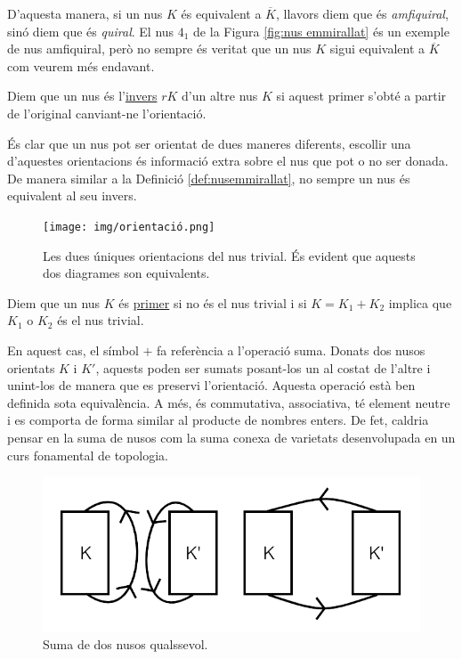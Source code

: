 D'aquesta manera, si un nus $K$ és equivalent a $\overline{K}$, llavors diem que és \textit{amfiquiral}, sinó diem que és \textit{quiral}. El nus $4_1$ de la Figura \ref{fig:nus emmirallat} és un exemple de nus amfiquiral, però no sempre és veritat que un nus $K$ sigui equivalent a $\overline{K}$ com veurem més endavant.

\begin{definition}\label{def:nusinvers}
	Diem que un nus és l'\underline{invers} $rK$ d'un altre nus $K$ si aquest primer s'obté a partir de l'original canviant-ne l'orientació.
\end{definition}

És clar que un nus pot ser orientat de dues maneres diferents, escollir una d'aquestes orientacions és informació extra sobre el nus que pot o no ser donada. De manera similar a la Definició \ref{def:nusemmirallat}, no sempre un nus és equivalent al  seu invers.

\begin{figure}
	\centering
	\texttt{[image: img/orientació.png]}
	\caption{Les dues úniques orientacions del nus trivial. És evident que aquests dos diagrames son equivalents.}\label{fig:nusorientat}
\end{figure}

\begin{definition}
	Diem que un nus $K$ és \underline{primer} si no és el nus trivial i si $K=K_1+K_2$ implica que $K_1$ o $K_2$ és el nus trivial.
\end{definition}

En aquest cas, el símbol $+$ fa referència a l'operació suma. Donats dos nusos orientats $K$ i $K'$, aquests poden ser sumats posant-los un al costat de l'altre i unint-los de manera que es preservi l'orientació. Aquesta operació està ben definida sota equivalència. A més, és commutativa, associativa, té element neutre i es comporta de forma similar al producte de nombres enters. De fet, caldria pensar en la suma de nusos com la suma conexa de varietats desenvolupada en un curs fonamental de topologia.\\

\begin{figure}
	\centering
	\includegraphics[width=0.9\linewidth]{img/nussuma.png}
	\caption{Suma de dos nusos qualssevol.}\label{fig:nussuma}
\end{figure}


